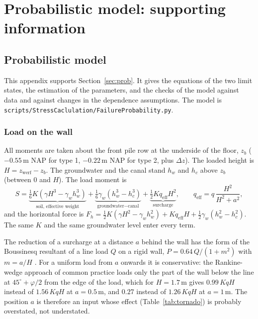 \chapter{Probabilistic model: supporting information}
\label{app:pm}


\section{Probabilistic model}\label{app:prob}

This appendix supports Section~\ref{sec:prob}. It gives the equations of the
two limit states, the estimation of the parameters, and the checks of the
model against data and against changes in the dependence assumptions. The
model is \texttt{scripts/StressCaclulation/FailureProbability.py}.

\subsection{Load on the wall}\label{app:prob-load}

All moments are taken about the front pile row at the underside of the floor,
$z_b$ ($-0.55$\,m NAP for type 1, $-0.22$\,m NAP for type 2, plus $\Delta z$).
The loaded height is $H = z_\text{werf} - z_b$. The groundwater and the canal
stand $h_w$ and $h_c$ above $z_b$ (between 0 and $H$). The load moment is
\begin{equation}
S = \underbrace{\tfrac{1}{6}K\left(\gamma H^3 - \gamma_w h_w^3\right)}_{\text{soil, effective weight}}
  + \underbrace{\tfrac{1}{6}\gamma_w\left(h_w^3 - h_c^3\right)}_{\text{groundwater} - \text{canal}}
  + \underbrace{\tfrac{1}{2}K q_\text{eff} H^2}_{\text{surcharge}},
\qquad q_\text{eff} = q\,\frac{H^2}{H^2 + a^2},
\label{eq:app-load}
\end{equation}
and the horizontal force is
$F_h = \tfrac12 K(\gamma H^2 - \gamma_w h_w^2) + K q_\text{eff} H
+ \tfrac12\gamma_w(h_w^2 - h_c^2)$. The same $K$ and the same groundwater
level enter every term.

The reduction of a surcharge at a distance $a$ behind the wall has the form of
the Boussinesq resultant of a line load $Q$ on a rigid wall,
$P = 0.64\,Q/(1+m^2)$ with $m = a/H$ \parencite{terzaghi1954,navfac1986}. For
a uniform load from $a$ onwards it is conservative: the Rankine-wedge approach
of common practice loads only the part of the wall below the line at
$45^\circ + \varphi/2$ from the edge of the load, which for $H = 1.7$\,m gives
$0.99\,KqH$ instead of $1.56\,KqH$ at $a = 0.5$\,m, and $0.27$ instead of
$1.26\,KqH$ at $a = 1$\,m. The position $a$ is therefore an input whose
effect (Table~\ref{tab:tornado}) is probably overstated, not understated.

